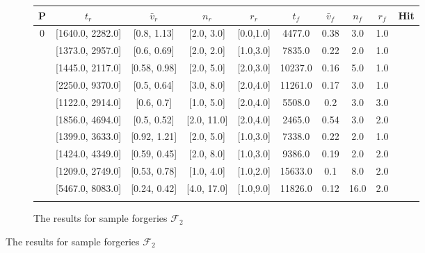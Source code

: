 \documentclass[a4paper, oneside]{csthesis}
\newcommand{\xmark}{\ding{55}}%
\begin{document}
\begin{figure}
    \begin{subfigure}[b]{\textwidth}
            \centering
            \tabcolsep 4pt
            \small
            \begin{tabular}{c|cccc||cccc||c}
            \hline
            \textbf{P} & $t_r$ & $\bar{v}_r$ & $n_r$ & $r_r$ & $t_f$ & $\bar{v}_f$ & $n_f$ & $r_f$ & Hit \\
            \hline
            0 & [1640.0, 2282.0] & [0.8, 1.13] & [2.0, 3.0] & [0.0,1.0] & 4477.0 & 0.38 & 3.0 & 1.0 & \xmark \\ \hdashline[0.5pt/3pt]
            1 & [1373.0, 2957.0] & [0.6, 0.69] & [2.0, 2.0] & [1.0,3.0] & 7835.0 & 0.22 & 2.0 & 1.0 & \xmark \\ \hdashline[0.5pt/3pt]
            2 & [1445.0, 2117.0] & [0.58, 0.98] & [2.0, 5.0] & [2.0,3.0] & 10237.0 & 0.16 & 5.0 & 1.0 & \xmark \\ \hdashline[0.5pt/3pt]
            3 & [2250.0, 9370.0] & [0.5, 0.64] & [3.0, 8.0] & [2.0,4.0] & 11261.0 & 0.17 & 3.0 & 1.0 & \xmark \\ \hdashline[0.5pt/3pt]
            4 & [1122.0, 2914.0] & [0.6, 0.7] & [1.0, 5.0] & [2.0,4.0] & 5508.0 & 0.2 & 3.0 & 3.0 & \xmark \\ \hdashline[0.5pt/3pt]
            5 & [1856.0, 4694.0] & [0.5, 0.52] & [2.0, 11.0] & [2.0,4.0] & 2465.0 & 0.54 & 3.0 & 2.0 & \xmark \\ \hdashline[0.5pt/3pt]
            6 & [1399.0, 3633.0] & [0.92, 1.21] & [2.0, 5.0] & [1.0,3.0] & 7338.0 & 0.22 & 2.0 & 1.0 & \xmark \\ \hdashline[0.5pt/3pt]
            7 & [1424.0, 4349.0] & [0.59, 0.45] & [2.0, 8.0] & [1.0,3.0] & 9386.0 & 0.19 & 2.0 & 2.0 & \xmark \\ \hdashline[0.5pt/3pt]
            8 & [1209.0, 2749.0] & [0.53, 0.78] & [1.0, 4.0] & [1.0,2.0] & 15633.0 & 0.1 & 8.0 & 2.0 & \xmark \\ \hdashline[0.5pt/3pt]
            9 & [5467.0, 8083.0] & [0.24, 0.42] & [4.0, 17.0] & [1.0,9.0] & 11826.0 & 0.12 & 16.0 & 2.0 & \xmark \\ \hdashline[0.5pt/3pt]
            \hline
            \end{tabular}
            \caption{The results for sample forgeries $\mathcal{F}_2$}
            \label{tbl:global-features-forg-sample}
    \end{subfigure}%


\end{figure}
\end{document}
